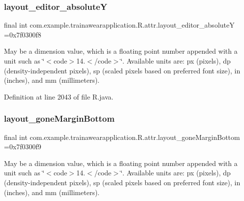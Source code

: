 \mbox{\label{classcom_1_1example_1_1trainawearapplication_1_1_r_1_1attr_ac6edf8148c894452ea2cf51a7470da4f}} 
\subsubsection{\texorpdfstring{layout\_editor\_absoluteY}{layout\_editor\_absoluteY}}
{\footnotesize\ttfamily final int com.\+example.\+trainawearapplication.\+R.\+attr.\+layout\+\_\+editor\+\_\+absoluteY =0x7f0300f8\hspace{0.3cm}{\ttfamily [static]}}

May be a dimension value, which is a floating point number appended with a unit such as \char`\"{}$<$code$>$14.\+5sp$<$/code$>$\char`\"{}. Available units are\+: px (pixels), dp (density-\/independent pixels), sp (scaled pixels based on preferred font size), in (inches), and mm (millimeters). 

Definition at line 2043 of file R.\+java.

\mbox{\label{classcom_1_1example_1_1trainawearapplication_1_1_r_1_1attr_af7ede1e194a5d45714927c5b07c3c7b1}} 
\subsubsection{\texorpdfstring{layout\_goneMarginBottom}{layout\_goneMarginBottom}}
{\footnotesize\ttfamily final int com.\+example.\+trainawearapplication.\+R.\+attr.\+layout\+\_\+gone\+Margin\+Bottom =0x7f0300f9\hspace{0.3cm}{\ttfamily [static]}}

May be a dimension value, which is a floating point number appended with a unit such as \char`\"{}$<$code$>$14.\+5sp$<$/code$>$\char`\"{}. Available units are\+: px (pixels), dp (density-\/independent pixels), sp (scaled pixels based on preferred font size), in (inches), and mm (millimeters). 

